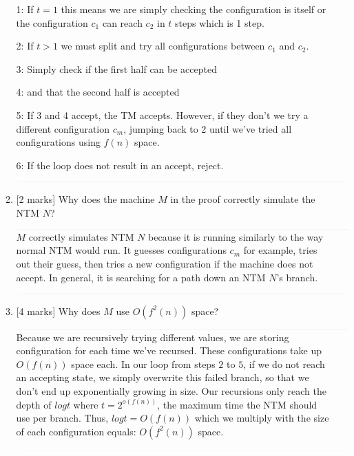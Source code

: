 \documentclass{article}
\begin{document}
\begin{enumerate}
\begin{enumerate}
            1: If $t = 1$ this means we are simply checking the configuration is itself or the configuration $c_1$ can reach $c_2$ in $t$ steps which is 1 step.

            2: If $t > 1$ we must split and try all configurations between $c_1$ and $c_2$.

            3: Simply check if the first half can be accepted

            4: and that the second half is accepted

            5: If 3 and 4 accept, the TM accepts. However, if they don't we try a different configuration $c_m$, jumping back to 2 until we've tried all configurations using $f(n)$ space.

            6: If the loop does not result in an accept, reject.

            $\textcolor[RGB]{220,220,220}{\rule{\linewidth}{0.2pt}}$

                \item {[2 marks]} Why does the machine $M$ in the proof correctly simulate the NTM $N$?

            $\textcolor[RGB]{220,220,220}{\rule{\linewidth}{0.2pt}}$
            $M$ correctly simulates NTM $N$ because it is running similarly to the way normal NTM would run. It guesses configurations $c_m$ for example, tries out their guess, then tries a new configuration if the machine does not accept. In general, it is searching for a path down an NTM $N$'s branch.

            $\textcolor[RGB]{220,220,220}{\rule{\linewidth}{0.2pt}}$

                \item {[4 marks]} Why does $M$ use $O(f^2(n))$ space?

            $\textcolor[RGB]{220,220,220}{\rule{\linewidth}{0.2pt}}$
            Because we are recursively trying different values, we are storing configuration for each time we've recursed. These configurations take up $O(f(n))$ space each. In our loop from steps $2$ to $5$, if we do not reach an accepting state, we simply overwrite this failed branch, so that we don't end up exponentially growing in size. Our recursions only reach the depth of $log t$ where $t = 2^{o(f(n))}$, the maximum time the NTM should use per branch. Thus, $log t = O(f(n))$ which we multiply with the size of each configuration equals: $O(f^2(n))$ space.

            $\textcolor[RGB]{220,220,220}{\rule{\linewidth}{0.2pt}}$

            \end{enumerate}
\end{enumerate}
\end{document}
